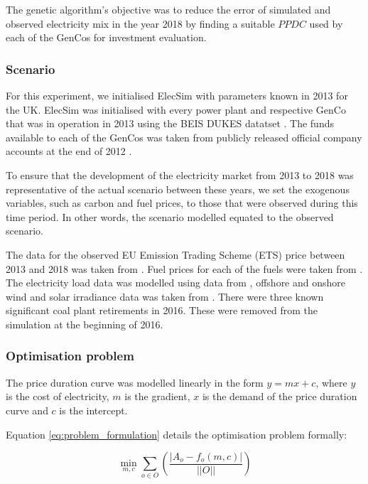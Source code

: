 The genetic algorithm's objective was to reduce the error of simulated and observed electricity mix in the year 2018 by finding a suitable $PPDC$ used by each of the GenCos for investment evaluation.

\subsubsection{Scenario}

For this experiment, we initialised ElecSim with parameters known in 2013 for the UK. ElecSim was initialised with every power plant and respective GenCo that was in operation in 2013 using the BEIS DUKES datatset \cite{dukes_511}. The funds available to each of the GenCos was taken from publicly released official company accounts at the end of 2012 \cite{companies_house}.

To ensure that the development of the electricity market from 2013 to 2018 was representative of the actual scenario between these years, we set the exogenous variables, such as carbon and fuel prices, to those that were observed during this time period. In other words, the scenario modelled equated to the observed scenario. 

The data for the observed EU Emission Trading Scheme (ETS) price between 2013 and 2018 was taken from \cite{eu-ets}. Fuel prices for each of the fuels were taken from \cite{beis_fuel_price}. The electricity load data was modelled using data from \cite{gridwatch}, offshore and onshore wind and solar irradiance data was taken from \cite{Pfenninger2016}. There were three known significant coal plant retirements in 2016. These were removed from the simulation at the beginning of 2016.



\subsubsection{Optimisation problem}
\label{ssec:optimisation-problem}

The price duration curve was modelled linearly in the form $y=mx+c$, where $y$ is the cost of electricity, $m$ is the gradient, $x$ is the demand of the price duration curve and $c$ is the intercept.

Equation \ref{eq:problem_formulation} details the optimisation problem formally:

\begin{equation}
\label{eq:problem_formulation}
\min_{m,c} \sum\limits_{o\in O}\left(
\frac{\left|A_o-f_o(m,c)\right|}
{\left|\left|O\right|\right|}
\right)
\end{equation}


